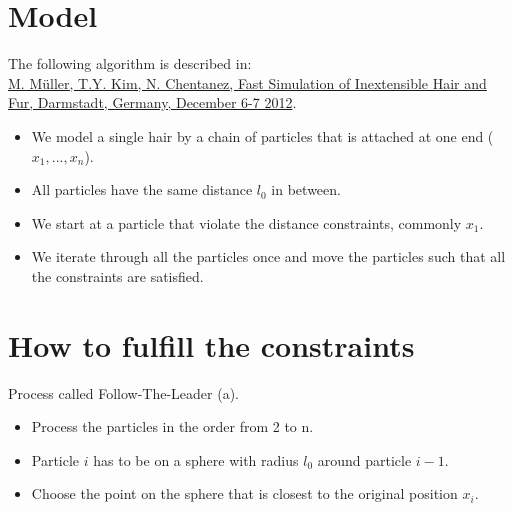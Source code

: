 \documentclass[
paper=192mm:144mm, %
fontsize=12pt, %
pagesize, %
parskip=half-, %
]{scrartcl} %
\theoremstyle{mythmstyle} %
\begin{document}
\clearpage


\section{\color{white}Model}

The following algorithm is described in:\\ \href{http://matthias-mueller-fischer.ch/publications/FTLHairFur.pdf}{M. Müller, T.Y. Kim, N. Chentanez,  Fast Simulation of Inextensible Hair and Fur, Darmstadt, Germany, December 6-7 2012}.

\begin{itemize}
\setlength\itemsep{-5mm}
\item We model a single hair by a chain of particles that is attached
at one end ($x_1,...,x_n$).
\item All particles have the same distance $l_0$ in between.
\item We start at a particle that violate the distance constraints, commonly $x_1$.
\item We iterate through all the particles once and move the particles such that all the constraints are satisfied.
\end{itemize}


\clearpage


\section{\color{white}How to fulfill the constraints}

Process called Follow-The-Leader (a).
\begin{itemize}
\setlength\itemsep{-5mm}
\item Process the particles in the order from 2 to n.
\item Particle $i$ has to be on a sphere with radius $l_0$ around particle $i-1$.
\item Choose the point on the sphere that is closest to the original position $x_i$.
\end{itemize}
\end{document}
